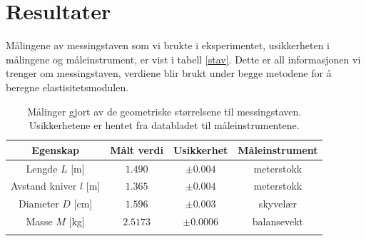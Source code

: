 \documentclass[%
 reprint,
 amsmath,amssymb,
 aps,
 norsk,
 booktabs
]{revtex4-1}
\begin{document}
\section{Resultater}
Målingene av messingstaven som vi brukte i eksperimentet, usikkerheten i målingene og måleinstrument, er vist i tabell \vref{stav}. Dette er all informasjonen vi trenger om messingstaven, verdiene blir brukt under begge metodene for å beregne elastisitetsmodulen.
\begin{table}[h!]
\centering
\caption{Målinger gjort av de geometriske størrelsene til messingstaven. Usikkerhetene er hentet fra databladet til måleinstrumentene.}
\label{stav}
\begin{tabular}{cccc}
    Egenskap & Målt verdi      &    Usikkerhet & Måleinstrument \\
    \toprule
    Lengde $L$ [m] & $1.490$    & $\pm 0.004$  & meterstokk  \\
    Avstand kniver $l$ [m] & $1.365$ & $\pm0.004$ & meterstokk \\
    Diameter $D$ [cm] & $1.596$    & $\pm0.003$ & skyvelær    \\
    Masse $M$    [kg]  & $2.5173$   & $\pm0.0006$   & balansevekt \\  \botrule
\end{tabular}
\end{table}
\end{document}
